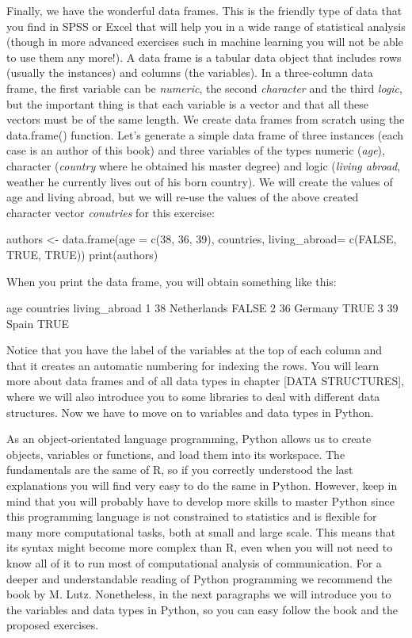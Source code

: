 Finally, we have the wonderful data frames. This is the friendly type of data that you find in SPSS or Excel that will help you in a wide range of statistical analysis (though in more advanced exercises such in machine learning you will not be able to use them any more!).  A data frame is a tabular data object that includes rows (usually the instances) and columns (the variables). In a three-column data frame, the first variable can be \emph{numeric}, the second \emph{character} and the third \emph{logic}, but the important thing is that each variable is a vector and that all these vectors must be of the same length. We create data frames from scratch using the data.frame() function.  Let’s generate a simple data frame of three instances (each case is an author of this book) and three variables of the types numeric (\emph{age}), character (\emph{country} where he obtained his master degree) and logic (\emph{living abroad}, weather he currently lives out of his born country). We will create the values of age and living abroad, but we will re-use the values of the above created character vector \emph{conutries} for this exercise:

\begin{exampler}
authors <- data.frame(age = c(38, 36, 39), countries, living_abroad= c(FALSE, TRUE, TRUE))
print(authors)
\end{exampler}

When you print the data frame, you will obtain something like this:

\begin{exampler}
  	age   	countries 		living_abroad
1 	 38 	Netherlands         	FALSE
2 	 36 	Germany         	TRUE
3 	 39    	Spain          		TRUE
\end{exampler}

Notice that you have the label of the variables at the top of each column and that it creates an automatic numbering for indexing the rows.  You will learn more about data frames and of all data types in chapter [DATA STRUCTURES], where we will also introduce you to some libraries to deal with different data structures. Now we have to move on to variables and data types in Python.

As an object-orientated language programming, Python allows us to create objects, variables or functions, and load them into its workspace. The fundamentals are the same of R, so if you correctly understood the last explanations you will find very easy to do the same in Python. However, keep in mind that you will probably have to develop more skills to master Python since this programming language is not constrained to statistics and is flexible for many more computational tasks, both at small and large scale. This means that its syntax might become more complex than R, even when you will not need to know all of it to run most of computational analysis of communication.  For a deeper and understandable reading of Python programming we recommend the book by M. Lutz\cite{lutz2013learning}. Nonetheless, in the next paragraphs we will introduce you to the variables and data types in Python, so you can easy follow the book and the proposed exercises.  

